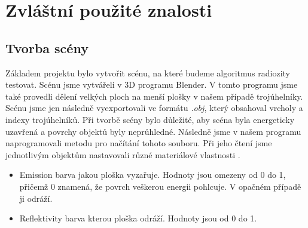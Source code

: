 \documentclass[12pt,a4paper,titlepage,final]{report}
\begin{document}
\chapter{Zvláštní použité znalosti}


\section{Tvorba scény}
Základem projektu bylo vytvořit scénu, na které budeme algoritmus radiozity testovat. Scénu jsme vytvářeli v 3D programu Blender. V tomto programu jsme také provedli dělení velkých ploch na menší plošky v našem případě trojúhelníky. Scénu jsme jen následně vyexportovali ve formátu \textit{.obj}, který obsahoval vrcholy a indexy trojúhelníků. Při tvorbě scény bylo důležité, aby scéna byla energeticky uzavřená a povrchy objektů byly neprůhledné. Následně jsme v našem programu naprogramovali metodu pro načítání tohoto souboru. Při jeho čtení jsme jednotlivým objektům nastavovali různé materiálové vlastnosti \cite{cite2}. 

\begin{itemize}
\item Emission barva jakou ploška vyzařuje. Hodnoty jsou omezeny od 0 do 1, přičemž 0 znamená, že povrch veškerou energii pohlcuje. V opačném případě ji odráží. 
\item Reflektivity barva kterou ploška odráží. Hodnoty jsou od 0 do 1.
\end{itemize}
\end{document}
